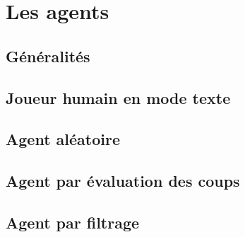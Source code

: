 \chapter{Les agents}

\section{Généralités}

\section{Joueur humain en mode texte}

\section{Agent aléatoire}

\section{Agent par évaluation des coups}

\section{Agent par filtrage}